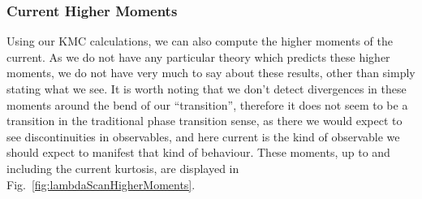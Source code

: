 \subsubsection{Current Higher Moments}
Using our KMC calculations, we can also compute the higher moments of the current. As we do not have any 
particular theory which predicts these higher moments, we do not have very much to say about these
results, other than simply stating what we see. It is worth noting that we don't detect divergences
in these moments around the bend of our ``transition'', therefore it does not seem to be a transition
in the traditional phase transition sense, as there we would expect to see discontinuities in observables,
and here current is the kind of observable we should expect to manifest that kind of behaviour.
These moments, up to and including the current kurtosis, are displayed in 
Fig.~\ref{fig:lambdaScanHigherMoments}.
